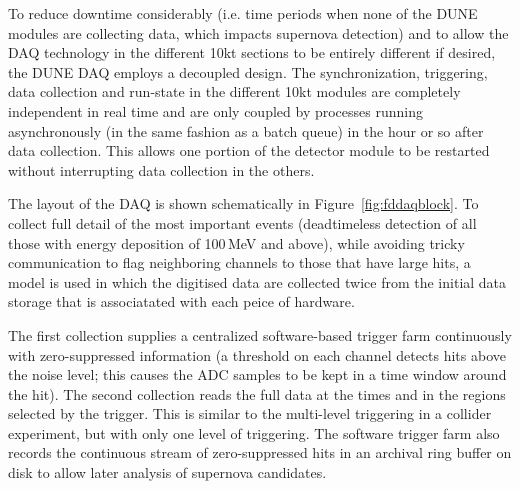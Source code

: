 To reduce downtime considerably (i.e. time periods when none of the DUNE modules are collecting data, which impacts supernova detection)
and to allow the DAQ technology in the different 10kt sections to be entirely different if desired, the DUNE DAQ employs a decoupled 
design. The synchronization, triggering, data collection and run-state in the different 10kt modules are completely independent in real time and
are only coupled by processes running asynchronously (in the same fashion as a batch queue) in the hour or so after data collection.
This allows one portion of the detector module to be restarted without interrupting
data collection in the others.

The layout of the DAQ is shown schematically in
Figure~\ref{fig:fddaqblock}.  To collect full detail of the
most important events (deadtimeless detection of all those with energy
deposition of 100\,MeV and above), while avoiding tricky communication
to flag neighboring channels to those that have large hits, a model is used
in which the digitised data are collected twice from the initial data
storage that is associatated with each peice of hardware. 


The first collection supplies a centralized software-based trigger farm continuously with
zero-suppressed information (a threshold on each channel detects hits above the noise level;
this causes the ADC samples to be kept in a time window around the hit).  
The second collection reads the full data at the times and in the regions %
selected by the trigger. This is similar to the multi-level triggering in a collider experiment,
but with only one level of triggering. The software trigger farm also
records the continuous stream of zero-suppressed hits in an archival
ring buffer on disk to allow later analysis of supernova candidates.

